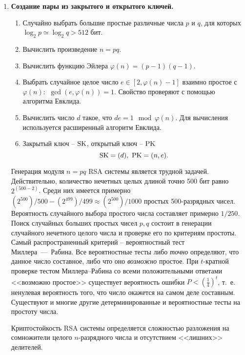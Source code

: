 \begin{enumerate}
    \item \textbf{Создание пары из закрытого и открытого ключей.}
        \begin{enumerate}
            \item Случайно выбрать большие простые различные числа $p$ и $q$, для которых $\log_2 p \simeq \log_2 q > 512$ бит.
            \item Вычислить произведение $n = pq$.
            \item Вычислить функцию Эйлера $\varphi(n) = (p-1)(q-1)$.
            \item Выбрать случайное целое число $e \in [2, \varphi(n)-1]$ взаимно простое с $\varphi(n)$: $~ \gcd(e, \varphi(n)) = 1$. Свойство проверяют с помощью алгоритма Евклида.
            \item Вычислить число $d$ такое, что  $d e= 1 \mod \varphi(n)$. Для вычисления используется расширенный алгоритм Евклида.
            \item Закрытый ключ -- $\textrm{SK}$, открытый ключ -- $\textrm{PK}$
                \[ \textrm{SK} = (d), ~ \textrm{PK} = (n, e). \]

        \end{enumerate}

Генерация модуля $n = pq$ RSA системы является трудной задачей. Действительно, количество нечетных целых длиной точно 500 бит равно $2^{(500-2)}$. Среди них имеется примерно
$(2^{500})/500 - (2^{499})/499 \approx (2^{500})/1000$ простых 500-разрядных чисел. Вероятность случайного выбора простого числа составляет примерно $1/250 $.
Поиск случайных больших простых чисел $p,q$ состоит в генерации случайного нечетного целого числа и проверке его по критериям простоты. Самый распространенный критерий -- вероятностный тест Миллера~---~Рабина. Все вероятностные тесты либо \emph{точно} определяют, что данное число составное, либо что оно \emph{возможно} простое. При $t$-кратной проверке тестом Миллера--Рабина со всеми положительными ответами <<возможно простое>> существует вероятность ошибки $P < \left( \frac{1}{4} \right)^t$, т.~е. ненулевая вероятность того, что число окажется на самом деле составным. Существуют и многие другие детерминированные и вероятностные тесты на простоту числа.

Криптостойкость RSA системы определяется сложностью разложения на сомножители целого $n$-разрядного числа и отсутствием <<лишних>> делителей.


\end{enumerate}
